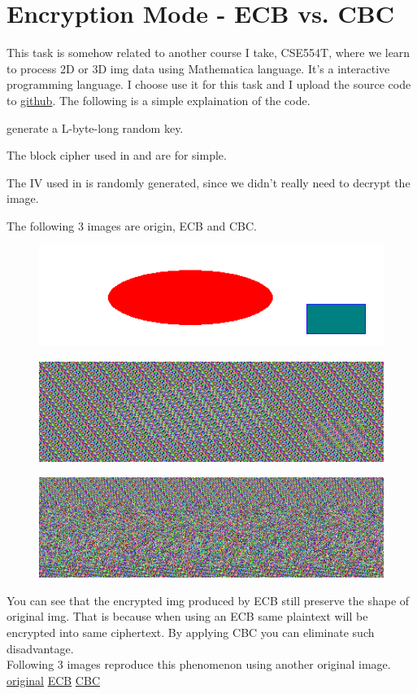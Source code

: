 \documentclass{article}
\begin{document}
    \section{Encryption Mode - ECB vs. CBC}
    This task is somehow related to another course I take, CSE554T, where we learn to process 2D or 3D img data using Mathematica language. It's a interactive programming language. I choose use it for this task and I upload the source code to \href{https://github.com/Luna1996/WUSTL/blob/master/571/L2/task2.m}{github}. The following is a simple explaination of the code.
    \begin{tlist}{3}
      \item[1.] generate a L-byte-long random key.
      \item[2.]The block cipher used in  and  are  for simple.
      \item[3.]The IV used in  is randomly generated, since we didn't really need to decrypt the image.
    \end{tlist}
    The following 3 images are origin, ECB and CBC.
    \begin{figure}[H]\centering\includegraphics{pic_original.png}\end{figure}
    \begin{figure}[H]\centering\includegraphics{pic_ecb.png}\end{figure}
    \begin{figure}[H]\centering\includegraphics{pic_cbc.png}\end{figure}
    You can see that the encrypted img produced by ECB still preserve the shape of original img. That is because when using an ECB same plaintext will be encrypted into same ciphertext. By applying CBC you can eliminate such disadvantage.\\
    Following 3 images reproduce this phenomenon using another original image.
    \href{https://i.loli.net/2018/09/24/5ba874d18c3b5.jpg}{original}
    \href{https://i.loli.net/2018/09/24/5ba874d19386e.jpg}{ECB}
    \href{https://i.loli.net/2018/09/24/5ba874d193869.jpg}{CBC}
\end{document}
